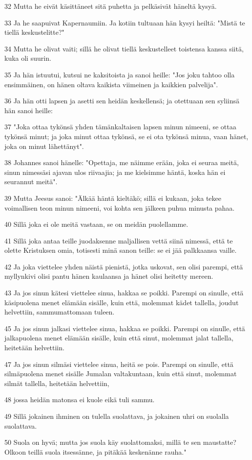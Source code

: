 \par 32 Mutta he eivät käsittäneet sitä puhetta ja pelkäsivät häneltä kysyä.
\par 33 Ja he saapuivat Kapernaumiin. Ja kotiin tultuaan hän kysyi heiltä: "Mistä te tiellä keskustelitte?"
\par 34 Mutta he olivat vaiti; sillä he olivat tiellä keskustelleet toistensa kanssa siitä, kuka oli suurin.
\par 35 Ja hän istuutui, kutsui ne kaksitoista ja sanoi heille: "Jos joku tahtoo olla ensimmäinen, on hänen oltava kaikista viimeinen ja kaikkien palvelija".
\par 36 Ja hän otti lapsen ja asetti sen heidän keskellensä; ja otettuaan sen syliinsä hän sanoi heille:
\par 37 "Joka ottaa tykönsä yhden tämänkaltaisen lapsen minun nimeeni, se ottaa tykönsä minut; ja joka minut ottaa tykönsä, se ei ota tykönsä minua, vaan hänet, joka on minut lähettänyt".
\par 38 Johannes sanoi hänelle: "Opettaja, me näimme erään, joka ei seuraa meitä, sinun nimessäsi ajavan ulos riivaajia; ja me kielsimme häntä, koska hän ei seurannut meitä".
\par 39 Mutta Jeesus sanoi: "Älkää häntä kieltäkö; sillä ei kukaan, joka tekee voimallisen teon minun nimeeni, voi kohta sen jälkeen puhua minusta pahaa.
\par 40 Sillä joka ei ole meitä vastaan, se on meidän puolellamme.
\par 41 Sillä joka antaa teille juodaksenne maljallisen vettä siinä nimessä, että te olette Kristuksen omia, totisesti minä sanon teille: se ei jää palkkaansa vaille.
\par 42 Ja joka viettelee yhden näistä pienistä, jotka uskovat, sen olisi parempi, että myllynkivi olisi pantu hänen kaulaansa ja hänet olisi heitetty mereen.
\par 43 Ja jos sinun kätesi viettelee sinua, hakkaa se poikki. Parempi on sinulle, että käsipuolena menet elämään sisälle, kuin että, molemmat kädet tallella, joudut helvettiin, sammumattomaan tuleen.
\par 45 Ja jos sinun jalkasi viettelee sinua, hakkaa se poikki. Parempi on sinulle, että jalkapuolena menet elämään sisälle, kuin että sinut, molemmat jalat tallella, heitetään helvettiin.
\par 47 Ja jos sinun silmäsi viettelee sinua, heitä se pois. Parempi on sinulle, että silmäpuolena menet sisälle Jumalan valtakuntaan, kuin että sinut, molemmat silmät tallella, heitetään helvettiin,
\par 48 jossa heidän matonsa ei kuole eikä tuli sammu.
\par 49 Sillä jokainen ihminen on tulella suolattava, ja jokainen uhri on suolalla suolattava.
\par 50 Suola on hyvä; mutta jos suola käy suolattomaksi, millä te sen maustatte? Olkoon teillä suola itsessänne, ja pitäkää keskenänne rauha."


